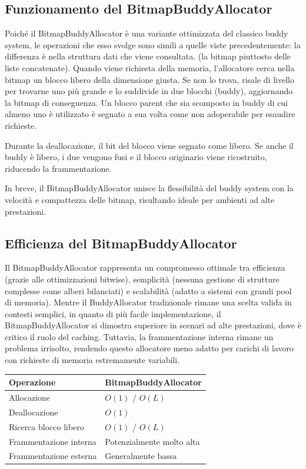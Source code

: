 \subsection*{Funzionamento del BitmapBuddyAllocator}
Poiché il BitmapBuddyAllocator è una variante ottimizzata del classico buddy system, le operazioni che esso svolge sono simili a quelle viste precedentemente: la differenza è nella struttura dati che viene consultata. (la bitmap piuttosto delle liste concatenate). Quando viene richiesta della memoria, l’allocatore cerca nella bitmap un blocco libero della dimensione giusta. Se non lo trova, risale di livello per trovarne uno più grande e lo suddivide in due blocchi (buddy), aggiornando la bitmap di conseguenza. Un blocco parent che sia scomposto in buddy di cui almeno uno è utilizzato è segnato a sua volta come non adoperabile per esaudire richieste.

Durante la deallocazione, il bit del blocco viene segnato come libero. Se anche il buddy è libero, i due vengono fusi e il blocco originario viene ricostruito, riducendo la frammentazione.

In breve, il BitmapBuddyAllocator unisce la flessibilità del buddy system con la velocità e compattezza delle bitmap, risultando ideale per ambienti ad alte prestazioni.

\subsection*{Efficienza del BitmapBuddyAllocator}
Il BitmapBuddyAllocator rappresenta un compromesso ottimale tra efficienza (grazie alle ottimizzazioni bitwise), semplicità (nessuna gestione di strutture complesse come alberi bilanciati) e scalabilità (adatto a sistemi con grandi pool di memoria). Mentre il BuddyAllocator tradizionale rimane una scelta valida in contesti semplici, in quanto di più facile implementazione, il BitmapBuddyAllocator si dimostra superiore in scenari ad alte prestazioni, dove è critico il ruolo del caching. Tuttavia, la frammentazione interna rimane un problema irrisolto, rendendo questo allocatore meno adatto per carichi di lavoro con richieste di memoria estremamente variabili.

\begin{center}
\begin{tabular}{|l|l|}
\hline
Operazione & BitmapBuddyAllocator \\
\hline
Allocazione & $O(1)$ / $O(L)$ \\
Deallocazione & $O(1)$ \\
Ricerca blocco libero & $O(1)$ / $O(L)$ \\
Frammentazione interna & Potenzialmente molto alta \\
Frammentazione esterna & Generalmente bassa \\
\hline
\end{tabular}
\end{center}
